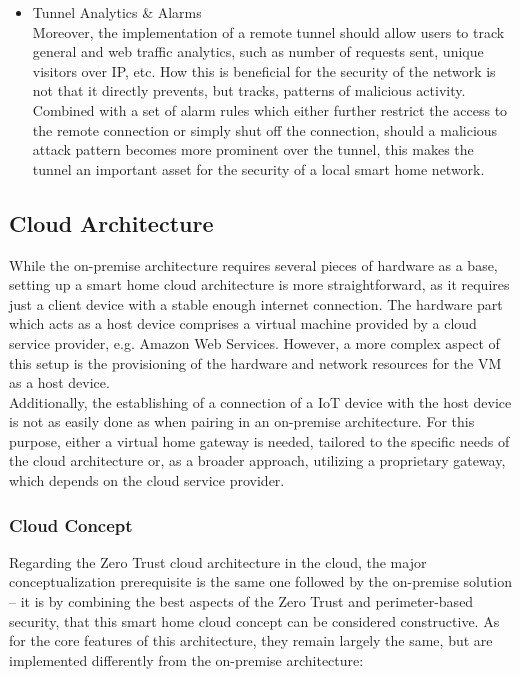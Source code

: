 \begin{itemize}
\item Tunnel Analytics \& Alarms\\
  Moreover, the implementation of a remote tunnel should allow users to track general and web traffic analytics, such as number of requests sent, unique visitors over IP, etc. How this is beneficial for the security of the network is not that it directly prevents, but tracks, patterns of malicious activity. Combined with a set of alarm rules which either further restrict the access to the remote connection or simply shut off the connection, should a malicious attack pattern becomes more prominent over the tunnel, this makes the tunnel an important asset for the security of a local smart home network. 
\end{itemize}

\subsection{Cloud Architecture}
While the on-premise architecture requires several pieces of hardware as a base, setting up a smart home cloud architecture is more straightforward, as it requires just a client device with a stable enough internet connection. The hardware part which acts as a host device comprises a virtual machine provided by a cloud service provider, e.g. Amazon Web Services. However, a more complex aspect of this setup is the provisioning of the hardware and network resources for the VM as a host device.\\
Additionally, the establishing of a connection of a IoT device with the host device is not as easily done as when pairing in an on-premise architecture. For this purpose, either a virtual home gateway is needed, tailored to the specific needs of the cloud architecture or, as a broader approach, utilizing a proprietary gateway, which depends on the cloud service provider.

\subsubsection{Cloud Concept}
Regarding the Zero Trust cloud architecture in the cloud, the major conceptualization prerequisite is the same one followed by the on-premise solution -- it is by combining the best aspects of the Zero Trust and perimeter-based security, that this smart home cloud concept can be considered constructive. As for the core features of this architecture, they remain largely the same, but are implemented differently from the on-premise architecture:

